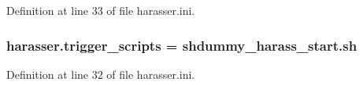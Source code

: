 Definition at line 33 of file harasser.\-ini.

\hypertarget{namespaceharasser_aaf0bf1c41f9f803a38db036d20b51461}{
\subsubsection[{trigger\-\_\-scripts}]{\setlength{\rightskip}{0pt plus 5cm}harasser.\-trigger\-\_\-scripts = shdummy\-\_\-harass\-\_\-start.\-sh}}\label{namespaceharasser_aaf0bf1c41f9f803a38db036d20b51461}


Definition at line 32 of file harasser.\-ini.

